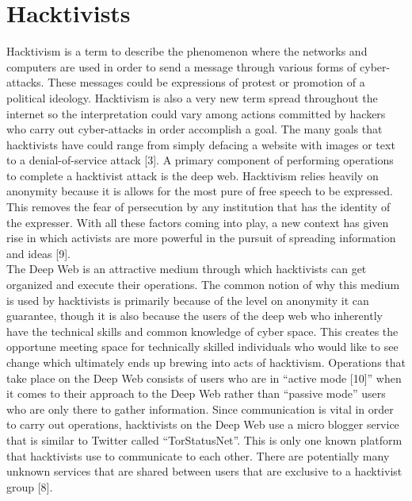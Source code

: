 \documentclass[twocolumn,letterpaper,10pt]{article}
\begin{document}
\section{Hacktivists}

Hacktivism is a term to describe the phenomenon where the networks and computers are used in order to send a message through various forms of cyber-attacks. These messages could be expressions of protest or promotion of a political ideology. Hacktivism is also a very new term spread throughout the internet so the interpretation could vary among actions committed by hackers who carry out cyber-attacks in order accomplish a goal. The many goals that hacktivists have could range from simply defacing a website with images or text to a denial-of-service attack [3]. A primary component of performing operations to complete a hacktivist attack is the deep web. Hacktivism relies heavily on anonymity because it is allows for the most pure of free speech to be expressed. This removes the fear of persecution by any institution that has the identity of the expresser. With all these factors coming into play, a new context has given rise in which activists are more powerful in the pursuit of spreading information and ideas [9].\\
\indent The Deep Web is an attractive medium through which hacktivists can get organized and execute their operations. The common notion of why this medium is used by hacktivists is primarily because of the level on anonymity it can guarantee, though it is also because the users of the deep web who inherently have the technical skills and common knowledge of cyber space. This creates the opportune meeting space for technically skilled individuals who would like to see change which ultimately ends up brewing into acts of hacktivism. Operations that take place on the Deep Web consists of users who are in “active mode [10]” when it comes to their approach to the Deep Web rather than “passive mode” users who are only there to gather information. Since communication is vital in order to carry out operations, hacktivists on the Deep Web use a micro blogger service that is similar to Twitter called “TorStatusNet”. This is only one known platform that hacktivists use to communicate to each other. There are potentially many unknown services that are shared between users that are exclusive to a hacktivist group [8].\\
\end{document}
